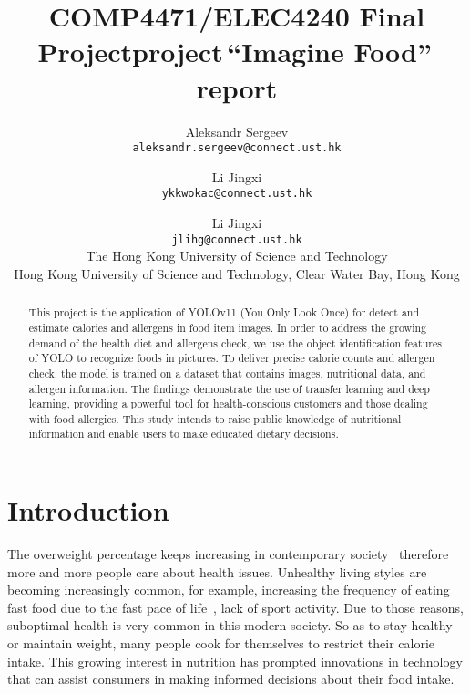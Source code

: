 \documentclass[10pt,twocolumn,letterpaper]{article}
\def\cvprPaperID{``Imagine Food''}
\def\confName{COMP4471/ELEC4240 Final Project}
\begin{document}
\title{\confName project\,\cvprPaperID\,report}

\author{
    Aleksandr Sergeev\\
    {\tt\small aleksandr.sergeev@connect.ust.hk}
    \and
    Li Jingxi\\
    {\tt\small ykkwokac@connect.ust.hk}
    \and
    Li Jingxi\\
    {\tt\small jlihg@connect.ust.hk}\\
    The Hong Kong University of Science and Technology\\
    Hong Kong University of Science and Technology, Clear Water Bay, Hong Kong
}
\maketitle


\begin{abstract}
        This project is the application of YOLOv11 (You Only Look Once) for detect and estimate calories and allergens in food item images.
        In order to address the growing demand of the health diet and allergens check, we use the object identification features of YOLO to recognize foods in pictures.
        To deliver precise calorie counts and allergen check, the model is trained on a dataset that contains images, nutritional data, and allergen information.
        The findings demonstrate the use of transfer learning and deep learning, providing a powerful tool for health-conscious customers and those dealing with food allergies.
        This study intends to raise public knowledge of nutritional information and enable users to make educated dietary decisions.
\end{abstract}


\section{Introduction}
\label{sec:intro}

The overweight percentage keeps increasing in contemporary society~\cite{nihoverweightobesity} therefore more and more people care about health issues.
Unhealthy living styles are becoming increasingly common, for example, increasing the frequency of eating fast food due to the fast pace of life~\cite{worldpopulationreviewfastfood}, lack of sport activity.
Due to those reasons, suboptimal health is very common in this modern society.
So as to stay healthy or maintain weight, many people cook for themselves to restrict their calorie intake.
This growing interest in nutrition has prompted innovations in technology that can assist consumers in making informed decisions about their food intake.
\end{document}
